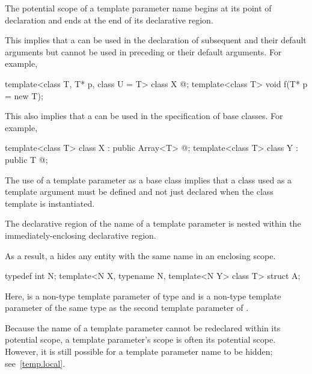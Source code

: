 \pnum
The potential scope of a template parameter name begins at its point of
declaration and ends at the end of its declarative region.
\begin{note}
This implies that a  can be used in the
declaration of subsequent  and their default
arguments but cannot be used in preceding  or their
default arguments. For example,
\begin{codeblock}
template<class T, T* p, class U = T> class X { @\commentellip@ };
template<class T> void f(T* p = new T);
\end{codeblock}

This also implies that a  can be used in the
specification of base classes. For example,
\begin{codeblock}
template<class T> class X : public Array<T> { @\commentellip@ };
template<class T> class Y : public T { @\commentellip@ };
\end{codeblock}
The use of a template parameter as a base class implies that a class used as a template
argument must be defined and not just declared when the class template is instantiated.
\end{note}

\pnum
The declarative region of the name of a template parameter is nested within the
immediately-enclosing declarative region.
\begin{note}
As a result, a
 hides any entity with the same name in an enclosing
scope.
\begin{example}
\begin{codeblock}
typedef int N;
template<N X, typename N, template<N Y> class T> struct A;
\end{codeblock}
Here,  is a non-type template parameter of type  and  is a
non-type template parameter of the same type as the second template parameter of
.
\end{example}
\end{note}

\pnum
\begin{note}
Because the name of a template parameter cannot be redeclared within its
potential scope, a template parameter's scope is often its potential
scope. However, it is still possible for a template parameter name to be hidden;
see~\ref{temp.local}.
\end{note}

